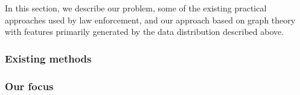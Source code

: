 In this section, we describe our problem, some of the existing practical approaches used by law enforcement, and our approach based on graph theory with features primarily generated by the data distribution described above.

\subsubsection{Existing methods}


\subsubsection{Our focus}

